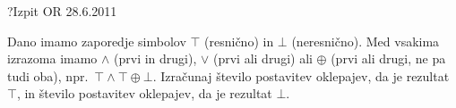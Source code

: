 \begin{naloga}{?}{Izpit OR 28.6.2011}
\begin{vprasanje}
Dano imamo zaporedje simbolov $\top$ (resnično) in $\bot$ (neresnično).
Med vsakima izrazoma imamo $\land$ (prvi in drugi),
$\lor$ (prvi ali drugi) ali $\oplus$ (prvi ali drugi, ne pa tudi oba),
npr.~$\top \land \top \oplus \bot$.
Izračunaj število postavitev oklepajev, da je rezultat $\top$,
in število postavitev oklepajev, da je rezultat $\bot$.
\end{vprasanje}
\begin{odgovor}
\end{odgovor}
\end{naloga}
